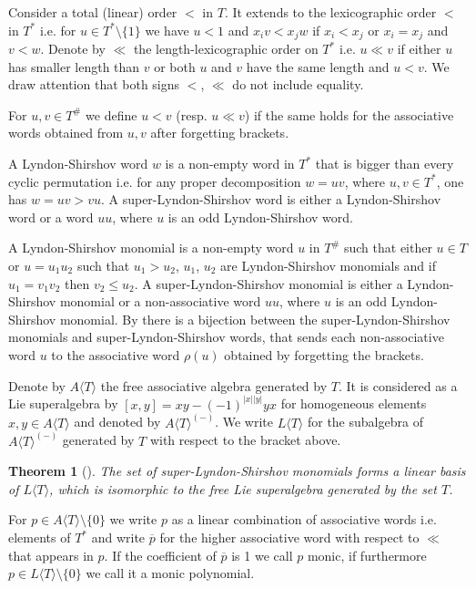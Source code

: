 \documentclass[12pt, reqno]{amsart}
\newtheorem{theorem}{Theorem}[section]
\theoremstyle{remark}
\theoremstyle{definition}
\numberwithin{equation}{section}
\begin{document}
 Consider a total (linear) order $< $ in $T$. It extends to the lexicographic order $< $ in $T^*$ i.e. for $u \in T^* \setminus \{ 1 \}$ we have $u < 1$ and $x_i v < x_j w$ if $x_i < x_j$ or $x_i = x_j$ and $v < w$. Denote by $\ll $ the length-lexicographic order on $T^*$ i.e. $u \ll v$ if either $u$ has smaller length than $v$ or both $u$ and $v$ have the same length and $u < v$.
 We draw attention that both signs $<$, $\ll $ do not include equality.

For $u, v \in T^{\#}$ we define $u < v$ (resp. $u \ll  v$) if the same holds for the  associative words obtained from $u,v$ after forgetting brackets.

A Lyndon-Shirshov word $w$ is a  non-empty word in $T^*$ that is bigger than every cyclic permutation i.e. 
for any proper decomposition $w=uv$, where $u,v\in T^*$, one has $w=uv > vu$.
A super-Lyndon-Shirshov word is either a Lyndon-Shirshov word or a word $uu$, where $u$ is 
 an odd Lyndon-Shirshov word. 

 A Lyndon-Shirshov monomial is a non-empty word $u$ in $T^{\#}$ such that
 either $u \in T$ or $u = u_1 u_2$ such that $u_1 > u_2$, $u_1$, $u_2$ are Lyndon-Shirshov monomials and if $u_1 = v_1 v_2$ then $v_2 \leq u_2$. A super-Lyndon-Shirshov monomial is either a Lyndon-Shirshov monomial or a non-associative word $uu$, where $u$ is  an odd Lyndon-Shirshov monomial. By \cite{BMPZ}  there is a bijection between the super-Lyndon-Shirshov monomials and super-Lyndon-Shirshov words, that sends each non-associative word $u$ to the associative word $\rho(u)$ obtained by forgetting the brackets.

 Denote by $A\langle T \rangle $ the free associative algebra generated by $T$. 
 It is considered as a Lie superalgebra by $[x,y] = xy - (-1)^{|x| |y|} yx$ for homogeneous elements $x,y \in A \langle T \rangle$ and denoted by $A \langle T \rangle ^{(-)}$. We write $L\langle T \rangle $ for 
 the subalgebra of $A \langle T \rangle ^{(-)}$  generated by $T$ with respect to the bracket above.

 \begin{theorem}[\cite{BMPZ}]  \label{free} The set of super-Lyndon-Shirshov monomials forms a linear basis of $L\langle T \rangle $,
 which is isomorphic to the free Lie superalgebra generated by the set $T$.
 \end{theorem}

 For  $p \in A \langle T \rangle \setminus \{ 0 \}$  we write $p$ as a linear combination of associative words i.e. elements of $T^*$ and write $\overline{p}$ for the higher associative word with respect to $\ll $ that appears in $p$. If the coefficient of $\overline{p}$ is 1 we call $p$ monic, if furthermore $p \in L \langle T \rangle \setminus \{ 0 \}$ we call it  a monic polynomial.
\end{document}
